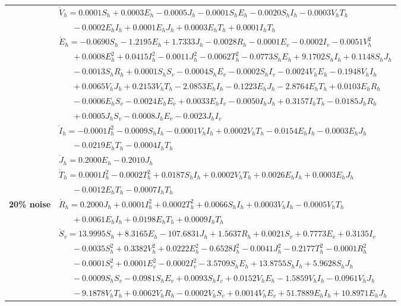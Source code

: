 \documentclass[9pt]{article}
\numberwithin{equation}{section}
\begin{document}
\begin{table}[ht]
    \begin{tabularx}{1\linewidth}{|l|X|} 
        & $\dot{V}_h=0.0001S_h+0.0003E_h-0.0005J_h-0.0001S_hE_h-0.0020S_hI_h-0.0003V_hT_h$ \\
        & $\quad\;\;-0.0002E_hI_h+0.0001E_hJ_h+0.0003E_hT_h+0.0001I_hT_h$ \\
        & $\dot{E}_h=-0.0690S_h-1.2195E_h+1.7333J_h-0.0028R_h-0.0001E_v-0.0002I_v-0.0051V_h^2$ \\
        & $\quad\;\;+0.0008E_h^2+0.0415I_h^2-0.0011J_h^2-0.0062T_h^2-0.0773S_hE_h+9.1702S_hI_h+0.1148S_hJ_h$ \\
        & $\quad\;\;-0.0013S_hR_h+0.0001S_hS_v-0.0004S_hE_v-0.0002S_hI_v-0.0024V_hE_h-0.1948V_hI_h$ \\
        & $\quad\;\;+0.0065V_hJ_h+0.2153V_hT_h-2.0853E_hI_h-0.1223E_hJ_h-2.8764E_hT_h+0.0103E_hR_h$ \\
        & $\quad\;\;-0.0006E_hS_v-0.0024E_hE_v+0.0033E_hI_v-0.0050I_hJ_h+0.3157I_hT_h-0.0185J_hR_h$ \\
        & $\quad\;\;+0.0005J_hS_v-0.0008J_hE_v-0.0023J_hI_v$ \\
        & $\dot{I}_h=-0.0001I_h^2-0.0009S_hI_h-0.0001V_hI_h+0.0002V_hT_h-0.0154E_hI_h-0.0003E_hJ_h$ \\
        & $\quad\;\;-0.0219E_hT_h-0.0004I_hT_h$ \\
        & $\dot{J}_h=0.2000E_h-0.2010J_h$ \\
        & $\dot{T}_h=0.0001I_h^2-0.0002T_h^2+0.0187S_hI_h+0.0002V_hT_h+0.0026E_hI_h+0.0003E_hJ_h$ \\
        & $\quad\;\;-0.0012E_hT_h-0.0007I_hT_h$ \\
        \textbf{20\% noise} & $\dot{R}_h=0.2000J_h+0.0001I_h^2+0.0002T_h^2+0.0066S_hI_h+0.0003V_hI_h-0.0005V_hT_h$ \\
        & $\quad\;\;+0.0061E_hI_h+0.0198E_hT_h+0.0009I_hT_h$ \\
        & $\dot{S}_v=13.9995S_h+8.3165E_h-107.6831J_h+1.5637R_h+0.0021S_v+0.7773E_v+0.3135I_v$ \\
        & $\quad\;\;-0.0035S_h^2+0.3382V_h^2+0.0222E_h^2-0.6528I_h^2-0.0041J_h^2-0.2177T_h^2-0.0001R_h^2$ \\
        & $\quad\;\;-0.0001S_v^2+0.0001E_v^2-0.0002I_v^2-3.5709S_hE_h+13.8755S_hI_h+5.9628S_hJ_h$ \\
        & $\quad\;\;-0.0009S_hS_v-0.0981S_hE_v+0.0093S_hI_v+0.0152V_hE_h-1.5859V_hI_h-0.0961V_hJ_h$ \\
        & $\quad\;\;-9.1878V_hT_h+0.0062V_hR_h-0.0002V_hS_v+0.0014V_hE_v+51.7889E_hI_h+10.8971E_hJ_h$ \\

\end{tabularx}
\end{table}
\end{document}
